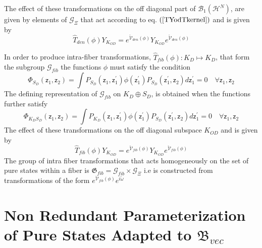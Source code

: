\documentclass[aps,preprint]{revtex4}%
\begin{document}
The effect of these transformations on the off diagonal part of $\mathcal{B}%
_{1}\left(  \mathcal{H}^{N}\right)  $, are given by elements of $\mathcal{G}%
_{\Xi}$ that act according to eq. $\left(  \ref{TYodTkernel}\right)  $ and is
given by
\begin{equation}
\hat{T}_{den}\left(  \phi\right)  Y_{K_{OD}}=e^{\mathcal{\breve{V}}%
_{den}\left(  \phi\right)  }Y_{K_{OD}}e^{\mathcal{\breve{V}}_{den}\left(
\phi\right)  }%
\end{equation}


In order to produce intra-fiber transformations, $\hat{T}_{fib}\left(
\phi\right)  :K_{D}\mapsto K_{D}$, that form the subgroup $\mathcal{G}_{fib}$
the functions $\phi$ must satisfy the condition
\begin{equation}
\Phi_{S_{D}}\left(  \mathsf{z}_{1},\mathsf{z}_{2}\right)  =\int P_{S_{D}%
}\left(  \mathsf{z}_{1},\mathsf{z}_{1}^{\prime}\right)  \phi\left(
\mathsf{z}_{1}^{\prime}\right)  P_{S_{D}}\left(  \mathsf{z}_{1}^{\prime
},\mathsf{z}_{2}\right)  d\mathsf{z}_{1}^{\prime}=0\quad\forall\mathsf{z}%
_{1},\mathsf{z}_{2}%
\end{equation}
The defining representation of $\mathcal{G}_{fib}$ on $K_{D}\oplus S_{D}$, is
obtained when the functions further satisfy
\begin{equation}
\Phi_{K_{D}S_{D}}\left(  \mathsf{z}_{1},\mathsf{z}_{2}\right)  =\int P_{K_{D}%
}\left(  \mathsf{z}_{1},\mathsf{z}_{1}^{\prime}\right)  \phi\left(
\mathsf{z}_{1}^{\prime}\right)  P_{S_{D}}\left(  \mathsf{z}_{1}^{\prime
},\mathsf{z}_{2}\right)  d\mathsf{z}_{1}^{\prime}=0\quad\forall\mathsf{z}%
_{1},\mathsf{z}_{2}%
\end{equation}
The effect of these transformations on the off diagonal subspace $K_{OD}$ and
is given by
\begin{equation}
\hat{T}_{fib}\left(  \phi\right)  Y_{K_{OD}}=e^{\mathcal{\breve{V}}%
_{fib}\left(  \phi\right)  }Y_{K_{OD}}e^{\mathcal{\breve{V}}_{fib}\left(
\phi\right)  }%
\end{equation}
The group of intra fiber transformations that acts homogeneously on the set of
pure states within a fiber is $\mathfrak{G}_{fib}=\mathcal{G}_{fib}%
\times\mathcal{G}_{\Xi}$ i.e is constructed from transformations of the form
$e^{\mathcal{\breve{V}}_{fib}\left(  \phi\right)  }e^{i\breve{\omega}}$

\section{Non Redundant Parameterization of Pure States Adapted to
$\mathfrak{B}_{vec}$}
\end{document}
